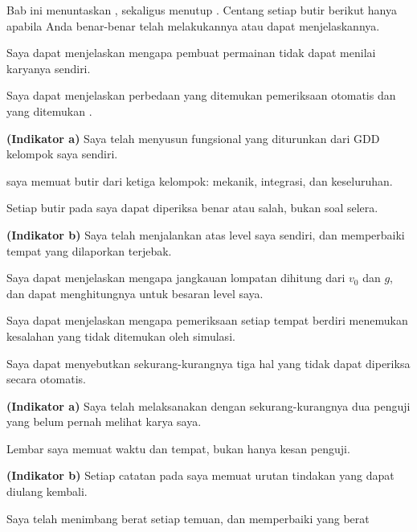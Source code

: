 
Bab ini menuntaskan , sekaligus menutup . Centang setiap
butir berikut hanya apabila Anda benar-benar telah melakukannya atau dapat
menjelaskannya.

\begin{checklistbox}
\begin{checklist}
  \item Saya dapat menjelaskan mengapa pembuat permainan tidak dapat menilai
        karyanya sendiri.
  \item Saya dapat menjelaskan perbedaan yang ditemukan pemeriksaan otomatis
        dan yang ditemukan .
  \item {\bfseries (Indikator a)} Saya telah menyusun 
        fungsional yang diturunkan dari GDD kelompok saya sendiri.
  \item {} saya memuat butir dari ketiga kelompok: mekanik,
        integrasi, dan keseluruhan.
  \item Setiap butir pada  saya dapat diperiksa benar atau
        salah, bukan soal selera.
  \item {\bfseries (Indikator b)} Saya telah menjalankan
         atas level saya sendiri, dan memperbaiki
        tempat yang dilaporkan terjebak.
  \item Saya dapat menjelaskan mengapa jangkauan lompatan dihitung dari
        $v_0$ dan $g$, dan dapat menghitungnya untuk besaran level saya.
  \item Saya dapat menjelaskan mengapa pemeriksaan setiap tempat berdiri
        menemukan kesalahan yang tidak ditemukan oleh simulasi.
  \item Saya dapat menyebutkan sekurang-kurangnya tiga hal yang tidak dapat
        diperiksa secara otomatis.
  \item {\bfseries (Indikator a)} Saya telah melaksanakan 
        dengan sekurang-kurangnya dua penguji yang belum pernah melihat karya
        saya.
  \item Lembar  saya memuat waktu dan tempat, bukan hanya
        kesan penguji.
  \item {\bfseries (Indikator b)} Setiap catatan pada  saya
        memuat urutan tindakan yang dapat diulang kembali.
  \item Saya telah menimbang berat setiap temuan, dan memperbaiki yang berat

\end{checklist}
\end{checklistbox}
